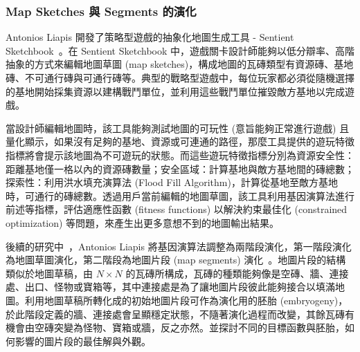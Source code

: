 





\subsubsection{Map Sketches 與 Segments 的演化}
\label{sssec:relatedworks-proceduralgamepatterns-mapsketches}

Antonios Liapis 開發了策略型遊戲的抽象化地圖生成工具 - Sentient Sketchbook~\cite{liapis2013generating}。在 Sentient Sketchbook 中，遊戲關卡設計師能夠以低分辯率、高階抽象的方式來編輯地圖草圖 (map sketches)，構成地圖的瓦磚類型有資源磚、基地磚、不可通行磚與可通行磚等。典型的戰略型遊戲中，每位玩家都必須從隨機選擇的基地開始採集資源以建構戰鬥單位，並利用這些戰鬥單位摧毀敵方基地以完成遊戲。

當設計師編輯地圖時，該工具能夠測試地圖的可玩性 (意旨能夠正常進行遊戲) 且量化顯示，如果沒有足夠的基地、資源或可連通的路徑，那麼工具提供的遊玩特徵指標將會提示該地圖為不可遊玩的狀態。而這些遊玩特徵指標分別為資源安全性：距離基地僅一格以內的資源磚數量；安全區域：計算基地與敵方基地間的磚總數；探索性：利用洪水填充演算法 (Flood Fill Algorithm)，計算從基地至敵方基地時，可通行的磚總數。透過用戶當前編輯的地圖草圖，該工具利用基因演算法進行前述等指標，評估適應性函數 (fitness functions) 以解決約束最佳化 (constrained optimization) 等問題，來產生出更多意想不到的地圖輸出結果。

後續的研究中~\cite{fig:multi-segment-evolution}，Antonios Liapis 將基因演算法調整為兩階段演化，第一階段演化為地圖草圖演化，第二階段為地圖片段 (map segments) 演化~\cite{liapis2017multi}。地圖片段的結構類似於地圖草稿，由 $N\times N$ 的瓦磚所構成，瓦磚的種類能夠像是空磚、牆、連接處、出口、怪物或寶箱等，其中連接處是為了讓地圖片段彼此能夠接合以填滿地圖。利用地圖草稿所轉化成的初始地圖片段可作為演化用的胚胎 (embryogeny)，於此階段定義的牆、連接處會呈顯穩定狀態，不隨著演化過程而改變，其餘瓦磚有機會由空磚突變為怪物、寶箱或牆，反之亦然。並探討不同的目標函數與胚胎，如何影響的圖片段的最佳解與外觀。

